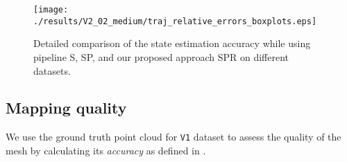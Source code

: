 



\begin{figure}[htbp]
  \centering     %

    \texttt{[image: ./results/V2\_02\_medium/traj\_relative\_errors\_boxplots.eps]}

  \caption{Detailed comparison of the state estimation accuracy while using pipeline S, SP, and our proposed approach SPR on different \Euroc{} datasets.}

  \label{fig:boxplot_rpe}
\end{figure}

\subsection{Mapping quality}
\label{ssec:mapping_quality}
We use the ground truth point cloud for \texttt{V1} dataset to assess the quality of the mesh by calculating its \textit{accuracy} as defined in \cite{Schoeps2017cvpr}.

